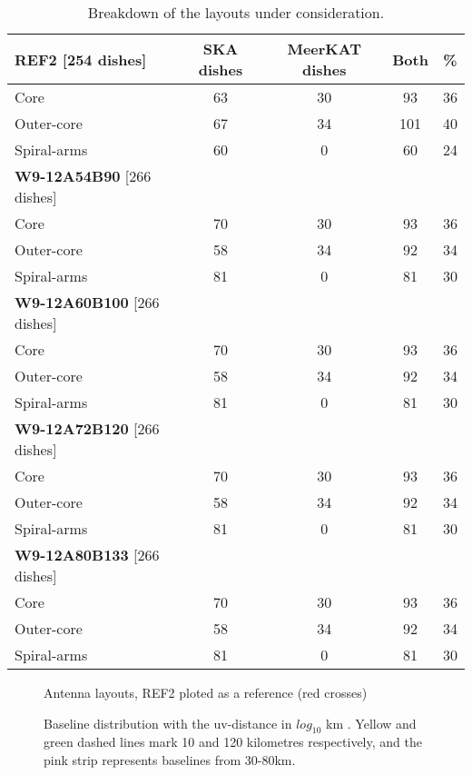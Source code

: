 \documentclass[sfheadings,a4paper,10pt,floats,floatfix]{article}
\begin{document}
\begin{table}[H]
\centering
 \tiny{
 \begin{tabular}{l|cccc}\hline
 {\bf REF2} [254 dishes] & SKA dishes&  MeerKAT dishes & Both & \% \\\hline\hline
  Core & 63 & 30 & 93 & 36 \\
 Outer-core & 67 & 34 & 101 & 40 \\
 Spiral-arms & 60 & 0 & 60 & 24 \\\hline\hline
  {\bf W9-12A54B90} [266 dishes] &  & &  & \\\hline\hline
  Core & 70 & 30 & 93 & 36 \\
 Outer-core & 58 & 34 & 92 & 34 \\
 Spiral-arms & 81 & 0 & 81 & 30 \\\hline\hline
  {\bf W9-12A60B100} [266 dishes] &  & &  & \\\hline\hline
  Core & 70 & 30 & 93 & 36 \\
 Outer-core & 58 & 34 & 92 & 34 \\
 Spiral-arms & 81 & 0 & 81 & 30 \\\hline\hline
  {\bf W9-12A72B120} [266 dishes] &  & &  & \\\hline\hline
  Core & 70 & 30 & 93 & 36 \\
 Outer-core & 58 & 34 & 92 & 34 \\
 Spiral-arms & 81 & 0 & 81 & 30 \\\hline\hline
   {\bf W9-12A80B133} [266 dishes] &  & &  & \\\hline\hline
  Core & 70 & 30 & 93 & 36 \\
 Outer-core & 58 & 34 & 92 & 34 \\
 Spiral-arms & 81 & 0 & 81 & 30 \\\hline
 \end{tabular}}
 \caption{Breakdown of the layouts under consideration.}\label{tab:lay}
\end{table}

\begin{figure}[H]
 \tiny{}
 \caption{Antenna layouts, REF2 ploted as a reference (red crosses)}\label{fig:lay}
\end{figure}
\begin{figure}[H]
 \tiny{}
 \caption{Baseline distribution with the uv-distance in $log_{10}$ km . Yellow and green dashed lines mark 10 and 120
kilometres respectively, and the pink strip represents baselines from 30-80km.}\label{fig:hist}
\end{figure}
\end{document}
